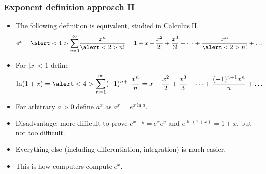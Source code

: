 \begin{frame}
\frametitle{Exponent definition approach II }
\begin{itemize}
\item<1-> The following definition is equivalent, studied in Calculus II.
\[
e^{x}=\alert<4>{\sum_{n=0}^{\infty}} \frac{x^n}{\alert<2>{n!}}= 1+ x+\frac{x^2}{2!}+\frac{x^3}{3!}+\dots + \frac{x^{n}}{\alert<2>{n!}}+\dots
\]
\item<3-> For $|x|<1$ define 
\[
\ln (1+x)=\alert<4>{\sum_{n=1}^{\infty}} (-1)^{n+1}\frac{x^n}{n}=  x-\frac{x^2}{2}+\frac{x^3}{3}-\dots + \frac{(-1)^{n+1}x^{n}}{n}+\dots
\]
\item<5-> For arbitrary $a>0$ define $a^x$ as $a^x=e^{x\ln a}$. 
\item<6-> Disadvantage: more difficult to prove $e^{x+y}=e^{x}e^y$ and $e^{\ln(1+x)}=1+x$, but not too difficult.
\item<7-> Everything else (including differentiation, integration) is much easier.
\item<8-> This is how computers compute $e^x$.
\end{itemize}
\end{frame}

